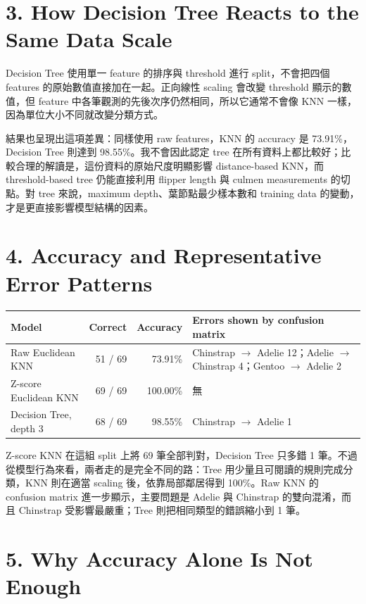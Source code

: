 \section*{3. How Decision Tree Reacts to the Same Data Scale}
\sectionrule

Decision Tree 使用單一 feature 的排序與 threshold 進行 split，不會把四個 features 的原始數值直接加在一起。正向線性 scaling 會改變 threshold 顯示的數值，但 feature 中各筆觀測的先後次序仍然相同，所以它通常不會像 KNN 一樣，因為單位大小不同就改變分類方式。

結果也呈現出這項差異：同樣使用 raw features，KNN 的 accuracy 是 73.91\%，Decision Tree 則達到 98.55\%。我不會因此認定 tree 在所有資料上都比較好；比較合理的解讀是，這份資料的原始尺度明顯影響 distance-based KNN，而 threshold-based tree 仍能直接利用 flipper length 與 culmen measurements 的切點。對 tree 來說，maximum depth、葉節點最少樣本數和 training data 的變動，才是更直接影響模型結構的因素。

\section*{4. Accuracy and Representative Error Patterns}
\sectionrule

\begin{table}[H]
\centering
\small
\begin{tabularx}{\linewidth}{YrrL{5.7cm}}
\toprule
\textbf{Model} & \textbf{Correct} & \textbf{Accuracy} & \textbf{Errors shown by confusion matrix} \\
\midrule
Raw Euclidean KNN & 51 / 69 & 73.91\% & Chinstrap $\rightarrow$ Adelie 12；Adelie $\rightarrow$ Chinstrap 4；Gentoo $\rightarrow$ Adelie 2 \\
Z-score Euclidean KNN & 69 / 69 & 100.00\% & 無 \\
Decision Tree, depth 3 & 68 / 69 & 98.55\% & Chinstrap $\rightarrow$ Adelie 1 \\
\bottomrule
\end{tabularx}
\end{table}

Z-score KNN 在這組 split 上將 69 筆全部判對，Decision Tree 只多錯 1 筆。不過從模型行為來看，兩者走的是完全不同的路：Tree 用少量且可閱讀的規則完成分類，KNN 則在適當 scaling 後，依靠局部鄰居得到 100\%。Raw KNN 的 confusion matrix 進一步顯示，主要問題是 Adelie 與 Chinstrap 的雙向混淆，而且 Chinstrap 受影響最嚴重；Tree 則把相同類型的錯誤縮小到 1 筆。

\section*{5. Why Accuracy Alone Is Not Enough}
\sectionrule

